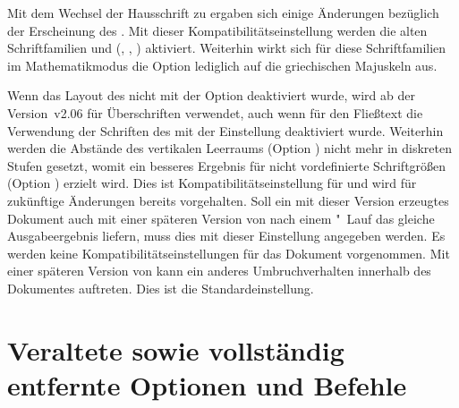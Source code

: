 \begin{Declaration}
\begin{DeclareValues}
  Mit dem Wechsel der Hausschrift zu \OpenSans ergaben sich einige Änderungen 
  bezüglich der Erscheinung des \CDs. Mit dieser Kompatibilitätseinstellung 
  werden die alten Schriftfamilien \Univers und \DIN 
  (, , )
  aktiviert. Weiterhin wirkt sich für diese Schriftfamilien im Mathematikmodus 
  die Option  lediglich auf die griechischen 
  Majuskeln aus.
  
  Wenn das Layout des \CDs nicht mit der Option  deaktiviert 
  wurde, wird ab der Version~v2.06 für Überschriften \OpenSans verwendet, auch 
  wenn für den Fließtext die Verwendung der Schriften des \CDs mit der 
  Einstellung  deaktiviert wurde. Weiterhin werden die 
  Abstände des vertikalen Leerraums (Option ) nicht 
  mehr in diskreten Stufen gesetzt, womit ein besseres Ergebnis für nicht 
  vordefinierte Schriftgrößen (Option ) erzielt wird.
  Dies ist Kompatibilitätseinstellung für \vTUDScript*{\TUDScript} und wird für 
  zukünftige Änderungen bereits vorgehalten. Soll ein mit dieser Version 
  erzeugtes Dokument auch mit einer späteren Version von \TUDScript nach einem 
  "~Lauf das gleiche Ausgabeergebnis liefern, muss dies mit 
  dieser Einstellung angegeben werden.
  Es werden keine Kompatibilitätseinstellungen für das Dokument vorgenommen. 
  Mit einer späteren Version von \TUDScript kann ein anderes Umbruchverhalten 
  innerhalb des Dokumentes auftreten. Dies ist die Standardeinstellung.
\end{DeclareValues}
\end{Declaration}
%
%



\section{%
  Veraltete sowie vollständig entfernte Optionen und Befehle%
  \label{sec:cessations}%
}

